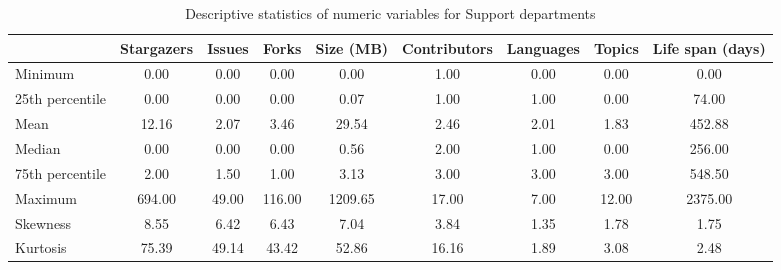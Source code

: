 
\begin{table}[h!]
\centering
\begin{adjustbox}{center}
\begin{tabular}{lcccccccc}
\toprule
{} &  Stargazers &  Issues &  Forks &  Size (MB) &  Contributors &  Languages &  Topics &  Life span (days) \\
\midrule
Minimum         &        0.00 &    0.00 &    0.00 &     0.00 &          1.00 &       0.00 &    0.00 &       0.00 \\
25th percentile &        0.00 &    0.00 &    0.00 &     0.07 &          1.00 &       1.00 &    0.00 &      74.00 \\
Mean            &       12.16 &    2.07 &    3.46 &    29.54 &          2.46 &       2.01 &    1.83 &     452.88 \\
Median          &        0.00 &    0.00 &    0.00 &     0.56 &          2.00 &       1.00 &    0.00 &     256.00 \\
75th percentile &        2.00 &    1.50 &    1.00 &     3.13 &          3.00 &       3.00 &    3.00 &     548.50 \\
Maximum         &      694.00 &   49.00 &  116.00 &  1209.65 &         17.00 &       7.00 &   12.00 &    2375.00 \\
Skewness        &        8.55 &    6.42 &    6.43 &     7.04 &          3.84 &       1.35 &    1.78 &       1.75 \\
Kurtosis        &       75.39 &   49.14 &   43.42 &    52.86 &         16.16 &       1.89 &    3.08 &       2.48 \\
\bottomrule
\end{tabular}
\end{adjustbox}
\caption{Descriptive statistics of numeric variables for Support departments}
\end{table}
